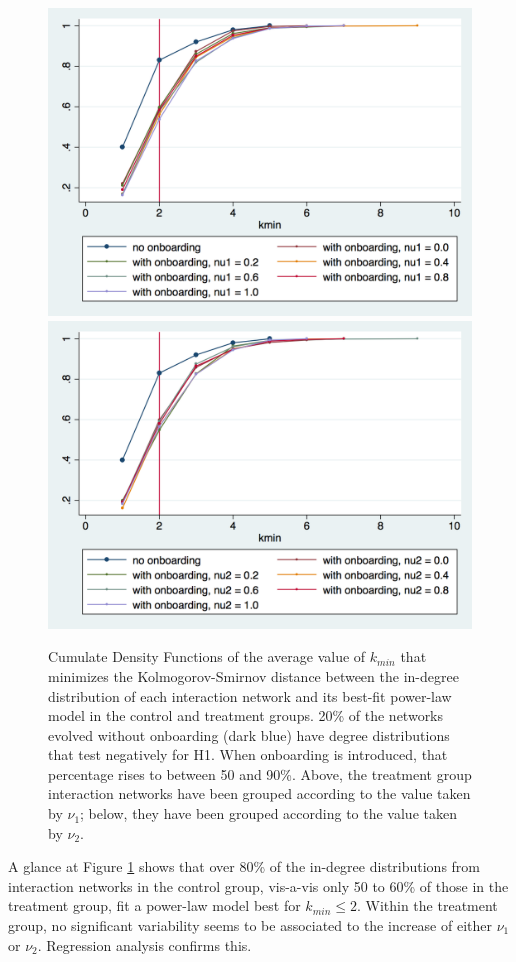 \documentclass{article}
\begin{document}

\begin{figure}[thb]
\centering

	\includegraphics[width=.75\linewidth]{./Pictures/CDF_kmin_nu1.png}
	\includegraphics[width=.75\linewidth]{./Pictures/CDF_kmin_nu2.png}
  \caption{Cumulate Density Functions of the average value of $k_{min}$ that minimizes the Kolmogorov-Smirnov distance between the in-degree distribution of each interaction network and its best-fit power-law model in the control and treatment groups. 20\% of the networks evolved without onboarding (dark blue) have degree distributions that test negatively for H1. When onboarding is introduced, that percentage rises to between 50 and 90\%. Above, the treatment group interaction networks have been grouped according to the value taken by $\nu_1$; below, they have been grouped according to the value taken by $\nu_2$.} 
 \label{fig:CDFkmin_nu_1nu_2}
\end{figure}

A glance at Figure \ref{fig:CDFkmin_nu_1nu_2} shows that over 80\% of the in-degree distributions from interaction networks in the control group, vis-a-vis only 50 to 60\% of those in the treatment group, fit a power-law model best for $k_{min} \leq 2$. Within the treatment group, no significant variability seems to be associated to the increase of either $\nu_1$ or $\nu_2$. Regression analysis confirms this.
\end{document}
